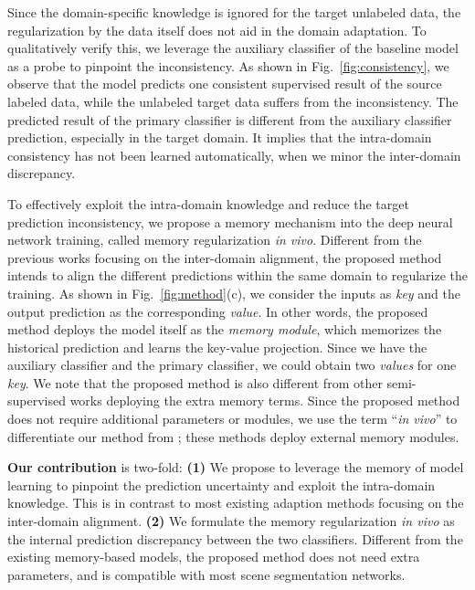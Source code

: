 \documentclass{article}
\begin{document}
Since the domain-specific knowledge is ignored for the target unlabeled data, the regularization by the data itself does not aid in the domain adaptation. To qualitatively verify this, we leverage the auxiliary classifier of the baseline model \cite{tsai2018learning} as a probe to pinpoint the inconsistency. As shown in Fig.~\ref{fig:consistency}, we observe that the model predicts one consistent supervised result of the source labeled data, while the unlabeled target data suffers from the  inconsistency. The predicted result of the primary classifier is different from the auxiliary classifier prediction, especially in the target domain. It implies that the intra-domain consistency has not been learned automatically, when we minor the inter-domain discrepancy.

To effectively exploit the intra-domain knowledge and reduce the target prediction inconsistency, we propose a memory mechanism into the deep neural network training, called memory regularization \emph{in vivo}. Different from the previous works focusing on the inter-domain alignment, the proposed method intends to align the different predictions within the same domain to regularize the training. 
As shown in Fig.~\ref{fig:method}(c), we consider the inputs as \emph{key} and the output prediction as the corresponding \emph{value}. In other words, the proposed method deploys the model itself as the \emph{memory module}, which memorizes the historical prediction and learns the key-value projection. Since we have the auxiliary classifier and the primary classifier, we could obtain two \emph{values} for one \emph{key}.  We note that the proposed method is also different from other semi-supervised works deploying the extra memory terms. Since the proposed method does not require additional parameters or modules, we use the term ``\emph{in vivo}'' to differentiate our method from \cite{chen2018semi,tarvainen2017mean,zhang2018deep}; these methods deploy external memory modules.

\textbf{Our contribution} is two-fold: \textbf{(1)} We propose to leverage the memory of model learning to pinpoint the prediction uncertainty and exploit the intra-domain knowledge. This is in contrast to most existing adaption methods focusing on the inter-domain alignment. \textbf{(2)} We formulate the memory regularization \emph{in vivo} as the internal prediction discrepancy between the two classifiers. Different from the existing memory-based models, the proposed method does not need extra parameters, and is compatible with most scene segmentation networks.
\end{document}
